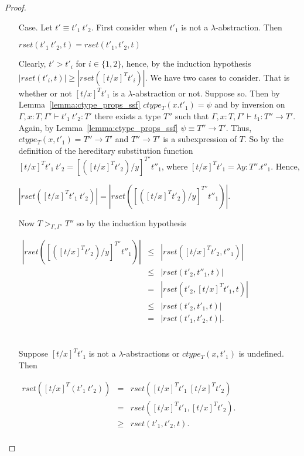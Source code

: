 \begin{proof}
\begin{itemize}
\item[Case.] Let $t' \equiv t'_1\ t'_2$.  First consider when $t'_1$ is not a $\lambda$-abstraction. Then
  \begin{center}
    $rset(t'_1\ t'_2, t) = rset(t'_1, t'_2, t)$
  \end{center}  
  Clearly,  $t' > t'_i$ for $i \in \{1,2\}$, hence, by the induction hypothesis $|rset(t'_i,t)| \geq |rset([t/x]^T t'_i)|$.  
  We have two cases to consider.  That is whether or not $[t/x]^T t'_1$ is a $\lambda$-abstraction or not.  Suppose so.
  Then by Lemma~\ref{lemma:ctype_props_ssf} $ctype_T(x.t'_1) = \psi$ and by inversion on $\Gamma,x:T,\Gamma' \vdash t'_1\ t'_2:T'$
  there exists a type $T''$ such that $\Gamma,x:T,\Gamma' \vdash t_1:T'' \to T'$.  Again, by Lemma~\ref{lemma:ctype_props_ssf}
  $\psi \equiv T'' \to T'$. Thus, $ctype_T(x,t'_1) = T'' \to T'$ and $T'' \to T'$ is a subexpression of $T$.
  So by the definition of the hereditary substitution function $[t/x]^T t'_1\ t'_2 = [([t/x]^T t'_2)/y]^{T''} t''_1$, where
  $[t/x]^T t'_1 = \lambda y:T''.t''_1$.  Hence,
  \begin{center}
    \begin{math}
      |rset([t/x]^T t'_1\ t'_2)| = |rset([([t/x]^T t'_2)/y]^{T''} t''_1)|.
    \end{math}
  \end{center}
  Now $T >_{\Gamma,\Gamma'} T''$ so by the induction hypothesis 
  \begin{center}
    \begin{math}
      \begin{array}{lll}
        |rset([([t/x]^T t'_2)/y]^{T''} t''_1)| & \leq & |rset([t/x]^T t'_2, t''_1)|\\
        & \leq & |rset(t'_2, t''_1, t)|\\
        & = & |rset(t'_2, [t/x]^T t'_1, t)|\\
        & \leq & |rset(t'_2, t'_1, t)|\\
        & = & |rset(t'_1, t'_2, t)|.\\
      \end{array}
    \end{math}
  \end{center}
  
  \ \\
  \noindent
  Suppose $[t/x]^T t'_1$ is not a $\lambda$-abstractions or $ctype_T(x,t'_1)$ is undefined.  Then
  \begin{center}
    \begin{math}
      \begin{array}{lll}
        rset([t/x]^T (t'_1\ t'_2)) & = & rset([t/x]^T t'_1\ [t/x]^T t'_2)\\
        & = & rset([t/x]^T t'_1, [t/x]^T t'_2).\\
        & \geq & rset(t'_1, t'_2, t).\\
      \end{array}
    \end{math}
  \end{center}
  

\end{itemize}
\end{proof}
